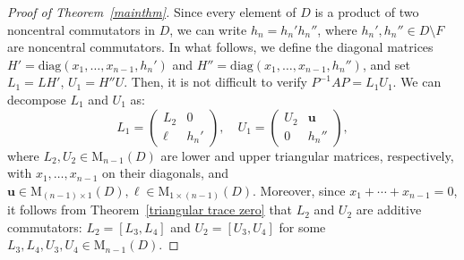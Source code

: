\documentclass[11pt]{article}
\theoremstyle{definition}
\begin{document}
{{{{\begin{proof}[Proof of Theorem~\ref{mainthm}]
					Since every element of $D$ is a product of two noncentral commutators in $D$, we can write $h_n = h_n' h_n''$, where $h_n', h_n'' \in D \setminus F$ are noncentral commutators. In what follows, we define the diagonal matrices $H' = \mathrm{diag}(x_1, \dots, x_{n-1}, h_n')$ and $H'' = \mathrm{diag}(x_1, \dots, x_{n-1}, h_n'')$, and set $L_1 = L H'$, $U_1 = H'' U$. Then, it is not difficult to verify  $
					P^{-1} A P = L_1 U_1.
					$ We can decompose $L_1$ and $U_1$ as:
					$$
					L_1 = \begin{pmatrix}
						L_2 & 0 \\
						\ell & h_n'
					\end{pmatrix}, \quad
					U_1 = \begin{pmatrix}
						U_2 & \mathbf{u} \\
						0 & h_n''
					\end{pmatrix},
					$$ where $L_2, U_2 \in \mathrm{M}_{n-1}(D)$ are lower and upper triangular matrices, respectively, with $x_1, \dots, x_{n-1}$ on their diagonals, and  $\mathbf{u}\in\mathrm{M}_{(n-1)\times 1}(D),\ell\in\mathrm{M}_{1\times (n-1)}(D)$. Moreover, since $x_1 + \cdots + x_{n-1} = 0$, it follows from Theorem~\ref{triangular trace zero} that $L_2$ and $U_2$ are additive commutators: $L_2 = [L_3, L_4]$ and $U_2 = [U_3, U_4]$ for some $L_3,L_4,U_3,U_4\in\mathrm{M}_{n-1}(D)$.
					

\end{proof}}}}}
\end{document}
